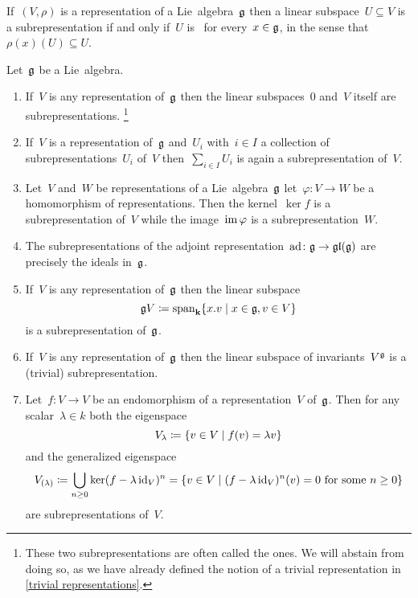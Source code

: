 \begin{remark}
  If~$(V, \rho)$ is a representation of a Lie~algebra~$\mathfrak{g}$ then a linear subspace~$U \subseteq V$ is a subrepresentation if and only if~$U$ is~{} for every~$x \in \mathfrak{g}$, in the sense that~$\rho(x)(U) \subseteq U$.
\end{remark}




\begin{examples}
  Let~$\mathfrak{g}$ be a Lie~algebra.
  \begin{enumerate}
    \item
      If~$V$ is any representation of~$\mathfrak{g}$ then the linear subspaces~$0$ and~$V$ itself are subrepresentations.%
    \footnote{These two subrepresentations are often called the  ones.
      We will abstain from doing so, as we have already defined the notion of a trivial representation in \cref{trivial representations}.}
    \item
      If~$V$ is a representation of~$\mathfrak{g}$ and~$U_i$ with~$i \in I$ a collection of subrepresentations~$U_i$ of~$V$ then~$\sum_{i \in I} U_i$ is again a subrepresentation of~$V$.
    \item
      Let~$V$ and~$W$ be representations of a Lie~algebra~$\mathfrak{g}$ let~$\varphi \colon V \to W$ be a homomorphism of representations.
      Then the kernel~$\ker f$ is a subrepresentation of~$V$ while the image~$\operatorname{im} \varphi$ is a subrepresentation~$W$.
    \item
      The subrepresentations of the adjoint representation~$\operatorname{ad} \colon \mathfrak{g} \to \mathfrak{gl}(\mathfrak{g})$ are precisely the ideals in~$\mathfrak{g}$.
    \item
      If~$V$ is any representation of~$\mathfrak{g}$ then the linear subspace
      \[
        \glie V
        \defined
        \vspan_\kf
        \{
          x.v
          \suchthat
          x \in \glie,
          v \in V
        \}
      \]
      is a subrepresentation of~$\mathfrak{g}$.
    \item
      If~$V$ is any representation of~$\mathfrak{g}$ then the linear subspace of invariants~$V^{\mathfrak{g}}$ is a (trivial) subrepresentation.
    \item
      Let~$f \colon V \to V$ be an endomorphism of a representation~$V$ of~$\mathfrak{g}$.
      Then for any scalar~$\lambda \in k$ both the eigenspace
      \[
        V_\lambda
        \defined
        \{
          v \in V
        \suchthat
          f(v)
          =
          \lambda v
        \}
      \]
      and the generalized eigenspace
      \[
        V_{(\lambda)}
        \defined
        \bigcup_{n \geq 0} \ker(f - \lambda \id_V)^n
        =
        \{
          v \in V
        \suchthat
        \text{$(f - \lambda \id_V)^n(v) = 0$ for some~$n \geq 0$}
        \}
      \]
      are subrepresentations of~$V$.
  \end{enumerate}
\end{examples}


